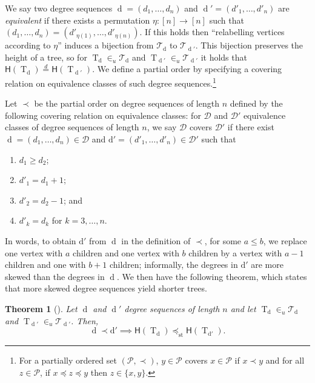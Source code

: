 \documentclass[10pt]{amsart}
\newtheorem{theo}{Theorem}[section]
\theoremstyle{definition}\newtheorem{defi}[theo]{Definition}\newtheorem{rema}[theo]{Remark}\newtheorem{exam}[theo]{Example}\newtheorem{exem}[theo]{Example}\newtheorem{nota}[theo]{Notation}
\newcommand{\height}{\mathsf{H}}
\newcommand{\sequence}[1]{\mathrm{#1}}
\DeclareMathOperator{\rtree}{T}
\DeclareMathOperator{\dseq}{d}
\DeclareMathOperator{\st}{st}
\newcommand\cD{\mathcal{D}}
\newcommand\cT{\mathcal{T}}
\newcommand{\clP}{\mathcal{P}}
\begin{document}
{We say two degree sequences $\dseq=(d_1,\dots,d_n)$ and $\dseq'=(d'_1,\dots,d'_n)$ are \emph{equivalent} if there exists a permutation $\eta:[n]\to [n]$ such that $(d_1,\dots,d_n)=(d'_{\eta(1)},\dots,d'_{\eta(n)})$. If this holds then ``relabelling vertices according to $\eta$'' induces a bijection from $\cT_{\dseq}$ to $\cT_{\dseq'}$. This bijection preserves the height of a tree, so for $\rtree_{\dseq}\in_u\cT_{\dseq}$ and $\rtree_{\dseq'}\in_u\cT_{\dseq'}$ it holds that $\height(\rtree_{\dseq})\overset{d}{=}\height(\rtree_{\dseq'})$. We define a partial order by specifying a covering relation on equivalence classes of such degree sequences.\footnote{For a partially ordered set $(\clP,\prec)$, $y \in\clP$ covers $x \in \clP$ if $x \prec y$ and for all $z \in \clP$, if $x \preceq z \preceq y$ then $z \in \{x,y\}$.}

Let $\prec$ be the partial order on degree sequences of length $n$ defined by the following covering relation on equivalence classes: for $\cD$ and $\cD'$ equivalence classes of degree sequences of length $n$, we say $\cD$ covers $\cD'$ if there exist $\dseq=(d_1,\dots,d_n)\in \cD$ and $\sequence{d'}=(d'_1,\dots,d'_n)\in \cD'$ such that
\begin{enumerate}
\item $d_1\geq d_2$;
\item $d'_1=d_1+1$;
\item $d'_2=d_2-1$; and
\item $d'_k=d_k$ for $k=3,\dots,n$.
\end{enumerate}

In words, to obtain $\sequence{d'}$ from $\dseq$ in the definition of $\prec$, for some $a\leq b$, we replace one vertex with $a$ children and one vertex with $b$ children by a vertex with $a-1$ children and one with $b+1$ children; informally, the degrees in $\sequence{d'} $ are more skewed than the degrees in $\dseq$. We then have the following theorem, which states that more skewed degree sequences yield shorter trees.}



\begin{theo}[{\cite[Theorem~9]{AD22}}]\label{thm:stochastic_order}
Let $\dseq$ and $\dseq'$ degree sequences of length $n$ and let $\rtree_{\dseq} \in_u \cT_{\dseq}$ and $\rtree_{\dseq'}\in_u \cT_{\dseq'}$. Then,
\[
\dseq \prec \sequence{d'} \implies \height(\rtree_{\dseq})\preceq_{\st} \height(\rtree_{\sequence{d'}}).
\]
\end{theo}
\end{document}
